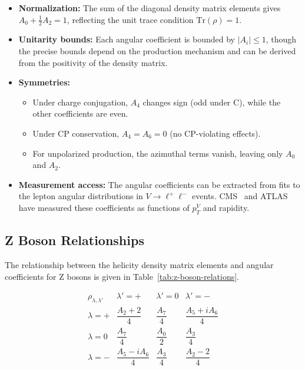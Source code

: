 \documentclass[11pt]{article}
\begin{document}
\begin{itemize}
    \item \textbf{Normalization:} The sum of the diagonal density matrix elements gives $A_0 + \frac{1}{2}A_2 = 1$, reflecting the unit trace condition $\text{Tr}(\rho) = 1$.

    \item \textbf{Unitarity bounds:} Each angular coefficient is bounded by $|A_i| \leq 1$, though the precise bounds depend on the production mechanism and can be derived from the positivity of the density matrix.

    \item \textbf{Symmetries:}
    \begin{itemize}
        \item Under charge conjugation, $A_4$ changes sign (odd under C), while the other coefficients are even.
        \item Under CP conservation, $A_4 = A_6 = 0$ (no CP-violating effects).
        \item For unpolarized production, the azimuthal terms vanish, leaving only $A_0$ and $A_2$.
    \end{itemize}

    \item \textbf{Measurement access:} The angular coefficients can be extracted from fits to the lepton angular distributions in $V \to \ell^+\ell^-$ events. CMS~\cite{CMS:2015cyj} and ATLAS~\cite{ATLAS:2016rnf} have measured these coefficients as functions of $p_T^V$ and rapidity.
\end{itemize}

\setlength{\arraycolsep}{25pt}
\renewcommand{\arraystretch}{2.0}

\subsection{Z Boson Relationships}

The relationship between the helicity density matrix elements and angular coefficients for Z bosons is given in Table~\ref{tab:z-boson-relations}.

\begin{table}[htbp]
    \centering
    \caption{
        Relationships between Z boson helicity density matrix elements and angular coefficients in the Collins-Soper frame.
        See appendix A of~\cite{ATLAS:2016rnf}.
    }
    \label{tab:z-boson-relations}
    \[
    \begin{array}{c|ccc}
        \rho_{\lambda,\lambda'} & \lambda' = + & \lambda' = 0 & \lambda' = - \\
        \hline
        \lambda = + & \dfrac{A_2 + 2}{4} & \dfrac{A_7}{4} & \dfrac{A_5 + iA_6}{4} \\
        \lambda = 0 & \dfrac{A_7}{4} & \dfrac{A_0}{2} & \dfrac{A_3}{4} \\
        \lambda = - & \dfrac{A_5 - iA_6}{4} & \dfrac{A_3}{4} & \dfrac{A_2 - 2}{4} \\
    \end{array}
    \]
\end{table}
\end{document}
